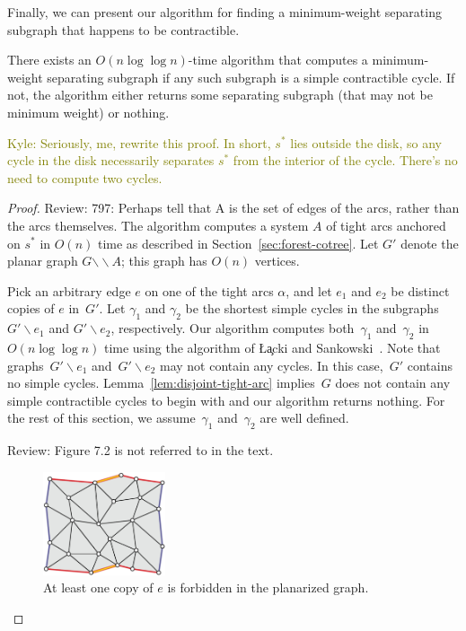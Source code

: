 \documentclass[letterpaper,review]{siamart190516}
\def\snip{\mathbin{\raisebox{0.15ex}{\rotatebox[origin=c]{60}{\Rightscissors}\!}}}
\def\snip{\mathbin{\backslash\!\!\backslash}}
\def\subsnip{\mathbin{\raisebox{0.15ex}{\rotatebox[origin=c]{60}{\footnotesize\Rightscissors}\!}}}
\def\Gsnip{\mathord{G_{\subsnip}}}
\def\Gsnip{G'}
\def\rnote#1{\color{red}Review: #1 \color{black}}
\def\knote#1{\textcolor{olive}{Kyle: #1}}
\begin{document}
{Finally, we can present our algorithm for finding a minimum-weight separating subgraph that happens
to be contractible.
\begin{lemma}
\label{lem:contractible-alg}
There exists an $O(n \log \log n)$-time algorithm that computes a minimum-weight separating subgraph if any such subgraph is a simple contractible cycle. If not, the algorithm either returns some separating subgraph (that may not be minimum weight) or nothing.
\end{lemma}

\knote{Seriously, me, rewrite this proof.
In short, \(s^*\) lies outside the disk, so any cycle in the disk necessarily separates \(s^*\) from
the interior of the cycle.
There's no need to compute two cycles.}

\begin{proof}

\rnote{797: Perhaps tell that A is the set of edges of the arcs, rather than the arcs themselves. }
The algorithm computes a system $A$ of tight arcs anchored on $s^*$ in $O(n)$ time as described in
Section~\ref{sec:forest-cotree}.
Let $\Gsnip$ denote the planar graph $G \snip A$; this graph has $O(n)$ vertices.

Pick an arbitrary edge $e$ on one of the tight arcs $\alpha$, and let $e_1$ and $e_2$ be distinct
copies of $e$
in~$\Gsnip$.  Let $\gamma_1$ and $\gamma_2$ be the shortest simple cycles in the  subgraphs $\Gsnip
\backslash e_1$ and $\Gsnip \backslash e_2$, respectively.  Our algorithm computes both~$\gamma_1$
and~$\gamma_2$ in $O(n \log\log n)$ time using the algorithm of \L\c{a}cki and
Sankowski~\cite{ls-mcsc-11}. Note that graphs~$\Gsnip \backslash e_1$ and~$\Gsnip \backslash e_2$
may not contain any cycles. In this case,~$\Gsnip$ contains no simple cycles.
Lemma~\ref{lem:disjoint-tight-arc} implies~$G$ does not contain any simple contractible cycles to begin with and our algorithm returns nothing. 
For the rest of this section, we assume~$\gamma_1$ and~$\gamma_2$ are well defined.

\rnote{Figure 7.2 is not referred to in the text. }
\begin{figure}[ht]
\centering
\includegraphics[height=1.2in]{Fig/forbidden-pair}
\caption{At least one copy of $e$ is forbidden in the planarized graph.}
\label{fig:global_forbidden-pair}
\end{figure}


\end{proof}}
\end{document}
